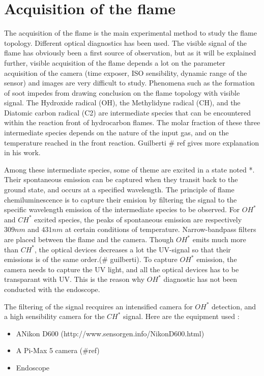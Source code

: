 \section{Acquisition of the flame}

The acquisition of the flame is the main experimental method to study the flame topology. Different optical diagnostics has been used. The visible signal of the flame has obviously been a first source of observation, but as it will be explained further, visible acquisition of the flame depends a lot on the parameter acquisition of the camera (time exposer, ISO sensibility, dynamic range of the sensor) and images are very difficult to study. Phenomena such as the formation of soot impedes from drawing conclusion on the flame topology with visible signal. The Hydroxide radical (OH), the Methylidyne radical (CH), and the Diatomic  carbon radical (C2) are intermediate species that can be encountered within the reaction front of hydrocarbon flames. The molar fraction of these three intermediate species depends on the nature of the input gas, and on the temperature reached in the front reaction. Guilberti \# ref gives more explanation in his work.

Among these intermediate species, some of theme are excited in a state noted *. Their spontaneous emission can be captured when they transit back to the ground state, and occurs at a specified wavelength. The principle of flame chemiluminescence is to capture their  emision by filtering the signal to the specific wavelength emission of the intermediate species to be observed. For $OH^*$ and $CH^*$ excited species, the peaks of spontaneous emission are respectively $309nm$ and $431nm$ at certain conditions of temperature. Narrow-bandpass filters are placed between the flame and the camera. Though $OH^*$ emits much more than $CH^*$, the optical devices decreases a lot the UV-signal so that their emissions is of the same order.(\# guilberti). To capture $OH^*$ emission, the camera needs to capture the UV light, and all the optical devices has to be transparant with UV. This is the reason why $OH^*$ diagnostic has not been conducted with the endoscope.

The filtering of the signal recquires an intensified camera for $OH^*$ detection, and a high sensibility camera for the $CH^*$ signal. Here are the equipment used :

\begin{itemize}
\item ANikon D600 (http://www.sensorgen.info/NikonD600.html)
\item A Pi-Max 5 camera (\#ref)
\item Endoscope
\end{itemize}
 




